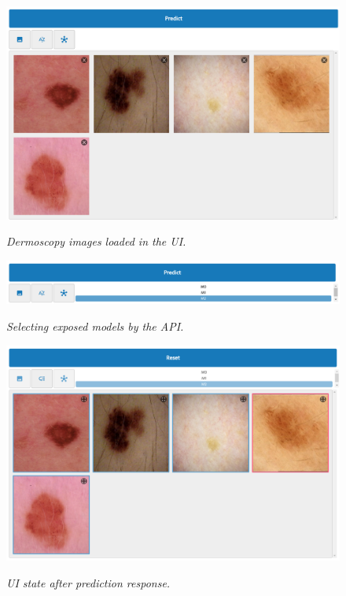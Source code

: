 \begin{figure}[H]
  \centering
  \begin{adjustbox}{width=\textwidth, trim={0cm 3.5cm 0cm 0cm}, clip}
    \includegraphics[width=\textwidth]{imatges/results/loaded-images.png}
  \end{adjustbox}
  \caption[Dermoscopy images loaded in the UI]{\textit{Dermoscopy images loaded in the UI. }}
  {\label{fig:loaded-images}}
\end{figure}

\begin{figure}[H]
  \centering
  \includegraphics[width=\textwidth]{imatges/results/selecting-model.png}
  \caption[Selecting exposed models by the API]{\textit{Selecting exposed models by the API. }}
  {\label{fig:selecting-model}}
\end{figure}

\begin{figure}[H]
  \centering
  \begin{adjustbox}{width=\textwidth, trim={0cm 3.55cm 0cm 0cm}, clip}
    \includegraphics[width=\textwidth]{imatges/results/after-prediction.png}
  \end{adjustbox}
  \caption[UI state after prediction response]{\textit{UI state after prediction response. }}
  {\label{fig:after-prediction}}
\end{figure}


